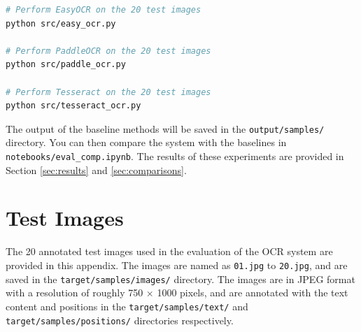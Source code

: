\documentclass[12pt,twoside]{report}
\begin{document}
\begin{appendices}
\begin{lstlisting}[language=bash]
# Perform EasyOCR on the 20 test images
python src/easy_ocr.py

# Perform PaddleOCR on the 20 test images
python src/paddle_ocr.py

# Perform Tesseract on the 20 test images
python src/tesseract_ocr.py
\end{lstlisting}

The output of the baseline methods will be saved in the \texttt{output/samples/} directory. You can then compare the system with the baselines in \texttt{notebooks/eval\_comp.ipynb}. The results of these experiments are provided in Section \ref{sec:results} and \ref{sec:comparisons}.

\chapter{Test Images}
\label{app:test_images}
The 20 annotated test images used in the evaluation of the OCR system are provided in this appendix. The images are named as \texttt{01.jpg} to \texttt{20.jpg}, and are saved in the \texttt{target/samples/images/} directory. The images are in JPEG format with a resolution of roughly 750 $\times$ 1000 pixels, and are annotated with the text content and positions in the \texttt{target/samples/text/} and \texttt{target/samples/positions/} directories respectively.


\end{appendices}
\end{document}
